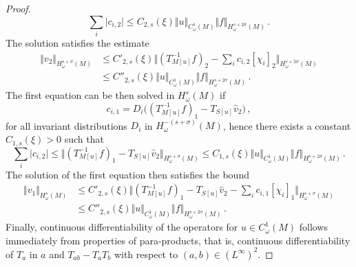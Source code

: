 \documentclass[10pt,a4paper]{amsart}
\begin{document}
\begin{proof}
$$\sum_i \vert c_{i,2} \vert  \leq  C_{2,s} (\xi)  \Vert u \Vert_{C^1_\omega(M)} \Vert f \Vert_{H^{s+2\sigma}_\omega(M)}\,.
$$
The solution satisfies the estimate 
$$
\begin{aligned}
\Vert  v_2 \Vert_{H^{s + \sigma}_\omega(M)} &\leq  C'_{2,s} (\xi)  \Vert (T^{-1}_{M[u]}  f )_2- \sum_i  c_{i,2} [\chi_{i}]_2\Vert_{H^{s + 2\sigma}_\omega(M)}
\\ & \leq  C''_{2,s} (\xi)  \Vert u \Vert_{C^1_\omega(M)}  \Vert f \Vert_{H^{s + 2\sigma}_\omega(M)} \,.
\end{aligned}
$$
The first equation can be then solved in $H^s_\omega(M)$  if 
$$
c_{i,1} = D_i \Big (  (T^{-1}_{M[u]}  f )_1 - T_{S[u]}  \hat v_2\Big)\,,
$$
for all invariant distributions 
$D_i$ in $H^{-(s+ \sigma)}_\omega(M)$, hence there exists a constant $C_{1,s}(\xi) >0$ such that 
$$
\sum_i \vert c_{i,2} \vert \leq \Vert  (T^{-1}_{M[u]}  f )_1 - T_{S[u]}  \hat v_2   \Vert_{H^{s+\sigma}_\omega(M)}  \leq  C_{1,s} (\xi)  \Vert u \Vert_{C^1_\omega(M)} \Vert f \Vert_{H^{s+2\sigma}_\omega(M)}\,.
$$
The solution of the first equation then satisfies the bound
$$
\begin{aligned}
\Vert  v_1 \Vert_{H^{s}_\omega(M)} &\leq  C'_{2,s} (\xi)  \Vert  (T^{-1}_{M[u]}  f )_1 - T_{S[u]}  \hat v_2-  \sum_i  c_{i,1} [\chi_{i}]_1\Vert_{H^{s + \sigma}_\omega(M)}
\\ & \leq  C''_{2,s} (\xi)  \Vert u \Vert_{C^1_\omega(M)}  \Vert f \Vert_{H^{s + 2\sigma}_\omega(M)} \,.
\end{aligned}
$$
Finally, continuous differentiability of the operators for $u\in C^1_\omega(M)$  follows immediately from properties of para-products, that is, continuous differentiability of 
$T_a$ in $a$ and $T_{ab}- T_aT_ b$ with respect to $(a, b)\in (L^{\infty})^2$.
\end{proof}
\end{document}
